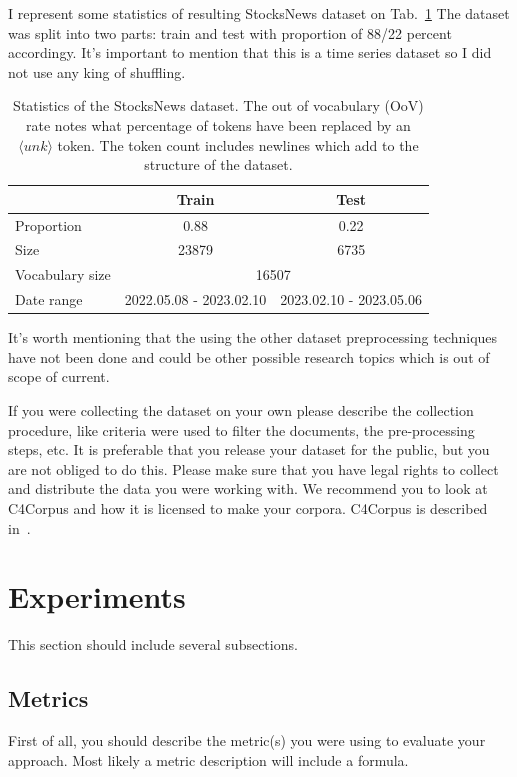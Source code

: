 \documentclass{article}
\begin{document}
I represent some statistics of resulting StocksNews dataset on Tab.~\ref{tab:statistics} The dataset was split into two parts: train and test with proportion of 88/22 percent accordingy. It's important to mention that this is a time series dataset so I did not use any king of shuffling. 

\begin{table}[tbh!]
\begin{center}
\begin{tabular}[t]{|l|cc|}
\hline
 & Train & Test \\
\hline
Proportion & 0.88 & 0.22  \\
Size & 23879 & 6735 \\
Vocabulary size & \multicolumn{2}{c|}{16507} \\
Date range & 2022.05.08 - 2023.02.10 & 2023.02.10 - 2023.05.06 \\

\hline
\end{tabular}
\caption{Statistics of the StocksNews dataset. The out of vocabulary (OoV) rate notes what percentage of tokens have been replaced by an $\langle unk \rangle$ token. The token count includes newlines which add to the structure of the dataset.}
\label{tab:statistics}
\end{center}
\end{table}

It's worth mentioning that the using the other dataset preprocessing techniques have not been done and could be other possible research topics which is out of scope of current.

If you were collecting the dataset on your own please describe the collection procedure, like criteria were used to filter the documents, the pre-processing steps, etc. It is preferable that you release your dataset for the public, but you are not obliged to do this. Please make sure that you have legal rights to collect and distribute the data you were working with. We recommend you to look at C4Corpus and how it is licensed to make your corpora. C4Corpus is described in~\cite{habernal2016c4corpus}.

\section{Experiments}
This section should include several subsections.
\subsection{Metrics}
First of all, you should describe the metric(s) you were using to evaluate your approach. Most likely a metric description will include a formula.
\end{document}
